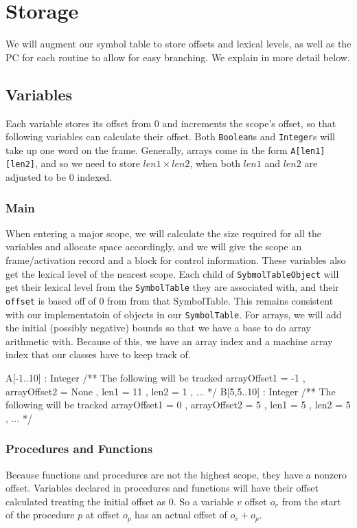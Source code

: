 \section{Storage}
 We will augment our symbol table to store offsets and lexical levels, as well
 as the PC for each routine to allow for easy branching. We explain in more
 detail below.
\subsection{Variables}
 Each variable stores its offset from 0 and increments the scope's offset, so
 that following variables can calculate their offset. Both \texttt{Boolean}s and
 \texttt{Integer}s will take up one word on the frame. Generally, arrays come in
 the form \texttt{A[len1][len2]}, and so we need to store $len1 \times len2$,
 when both $len1$ and $len2$ are adjusted to be 0 indexed.
\subsubsection{Main}
  When entering a major scope, we will calculate the size required for all
  the variables and allocate space accordingly, and we will give the scope an
  frame/activation record and a block for control information. These variables
  also get the lexical level of the nearest scope. Each child of
  \texttt{SybmolTableObject} will get their lexical level from the
  \texttt{SymbolTable} they are associated with, and their \texttt{offset} is
  based off of 0 from from that SymbolTable. This remains consistent with our
  implementatoin of objects in our \texttt{SymbolTable}. For arrays, we will add
  the initial (possibly negative) bounds so that we have a base to do array
  arithmetic with.  Because of this, we have an array index and a machine array
  index that our classes have to keep track of.

  \begin{code}
    A[-1..10] : Integer
    /** The following will be tracked 
      { arrayOffset1 = -1
      , arrayOffset2 = None
      , len1 = 11 
      , len2 = 1
      , ...
      }
    */
    B[5,5..10] : Integer
    /** The following will be tracked 
      { arrayOffset1 = 0
      , arrayOffset2 = 5
      , len1 = 5
      , len2 = 5
      , ...
      }
    */
  \end{code}
  
\subsubsection{Procedures and Functions}
  Because functions and procedures are not the highest scope, they have a
  nonzero offset. Variables declared in procedures and functions will have their
  offset calculated treating the initial offset as 0. So a variable $v$ offset
  $o_v$ from the start of the procedure $p$ at offset $o_p$ has an actual offset
  of $o_v + o_p$.
  
